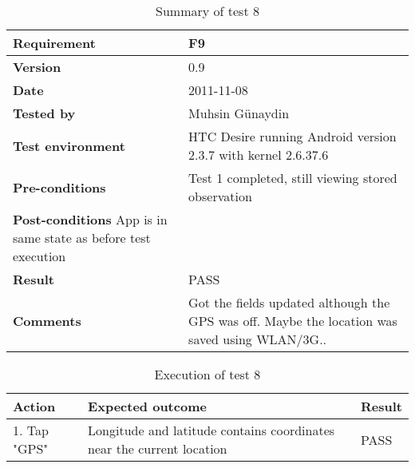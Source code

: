 	\begin{table}[htb]
		\centering
		\begin{tabular}{|p{3.5cm}|p{7.0cm}|} \hline
			\textbf{Requirement} & F9 \\ \hline
			\textbf{Version} & 0.9 \\ \hline
			\textbf{Date} & 2011-11-08 \\ \hline
			\textbf{Tested by} & Muhsin Günaydin \\ \hline
			\textbf{Test environment} & HTC Desire running Android version 2.3.7 with kernel 2.6.37.6 \\ \hline
			\textbf{Pre-conditions} & Test 1 completed, still viewing stored observation \\ \hline
			\textbf{Post-conditions} App is in same state as before test execution &  \\ \hline
			\textbf{Result} & PASS \\ \hline
			\textbf{Comments} & Got the fields updated although the GPS was off. Maybe the location was saved using WLAN/3G..  \\
			\hline
		\end{tabular}
		\caption{Summary of test 8}
	\end{table}

	\begin{table}[htb]
		\centering
		\begin{tabular}{|p{5.0cm}|p{5.0cm}|p{1cm}|}
			\hline \textbf{Action} & \textbf{Expected outcome} & \textbf{Result} \\ \hline
			
			1. Tap "GPS" &
			Longitude and latitude contains coordinates near the current location &
			PASS \\ \hline

		\end{tabular}
		\caption{Execution of test 8}
	\end{table}

\newpage
